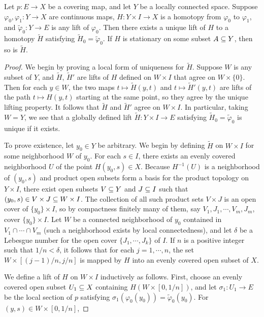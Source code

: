 \begin{theorem}\label{homotopy lift}
Let $p:E\to X$ be a covering map, and let $Y$ be a locally connected space. Suppose $\varphi_0,\varphi_1:Y\to X$ are continuous maps, $H:Y\times I\to X$ is a homotopy from $\varphi_0$ to $\varphi_1$, and $\widetilde{\varphi}_0:Y\to E$ is any lift of $\varphi_0$. Then there exists a unique lift of $H$ to a homotopy $\widetilde{H}$ satisfying $\widetilde{H}_0=\widetilde{\varphi}_0$. If $H$ is stationary on some subset $A\subseteq Y$, then so is $\widetilde{H}$.
\end{theorem}
\begin{proof}
We begin by proving a local form of uniqueness for $\widetilde{H}$. Suppose $W$ is any
subset of $Y$, and $\widetilde{H}$, $\widetilde{H}'$ are lifts of $H$ defined on $W\times I$ that agree on $W\times\{0\}$. Then for each $y\in W$, the two maps $t\mapsto\widetilde{H}(y,t)$ and $t\mapsto\widetilde{H}'(y,t)$ are lifts of the path
$t\mapsto H(y,t)$ starting at the same point, so they agree by the unique lifting property. It follows that $\widetilde{H}$ and $\widetilde{H}'$ agree on $W\times I$. In particular, taking $W=Y$, we see that a globally defined lift $\widetilde{H}:Y\times I\to E$ satisfying $\widetilde{H}_0=\widetilde{\varphi}_0$ is unique if it exists.\par
To prove existence, let $y_0\in Y$ be arbitrary. We begin by defining $\widetilde{H}$ on $W\times I$ for some neighborhood $W$ of $y_0$. For each $s\in I$, there exists an evenly covered neighborhood $U$ of the point $H(y_0,s)\in X$. Because $H^{-1}(U)$ is a neighborhood of $(y_0,s)$ and product open subsets form a basis for the product topology on $Y\times I$, there exist open subsets $V\subseteq Y$ and $J\subseteq I$ such that $(y_0,s)\in V\times J\subseteq W\times I$. The collection of all such product sets $V\times J$ is an open cover of $\{y_0\}\times I$, so by compactness finitely many of them, say $V_1,J_1,\cdots,V_m,J_m$, cover $\{y_0\}\times I$. Let $W$ be a connected neighborhood of $y_0$ contained in $V_1\cap\cdots\cap V_m$ (such a neighborhood exists by local connectedness), and let $\delta$ be a Lebesgue number for the open cover $\{J_1,\cdots,J_k\}$ of $I$. If $n$ is a positive integer such that $1/n<\delta$, it follows that for each $j=1,\cdots,n$, the set $W\times[(j-1)/n,j/n]$ is mapped by $H$ into an evenly covered open subset of $X$.\par
We define a lift of $H$ on $W\times I$ inductively as follows. First, choose an evenly
covered open subset $U_1\subseteq X$ containing $H(W\times[0,1/n])$, and let $\sigma_1:U_1\to E$ be the local section of $p$ satisfying $\sigma_1(\varphi_0(y_0))=\widetilde{\varphi}_0(y_0)$. For $(y,s)\in W\times[0,1/n]$,

\end{proof}
